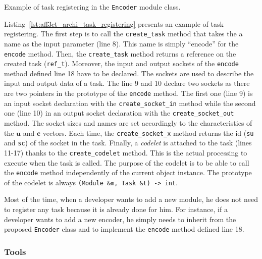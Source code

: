\begin{listing}[htp]
  \inputminted[frame=lines,linenos]{C++}{\curChapter/src/archi/task_registering.cpp}
  \caption{Example of task registering in the \texttt{Encoder} module class.}
  \label{lst:aff3ct_archi_task_registering}
\end{listing}

Listing~\ref{lst:aff3ct_archi_task_registering} presents an example of task
registering. The first step is to call the \verb|create_task| method that
takes the a name as the input parameter (line 8). This name is simply ``encode''
for the \verb|encode| method. Then, the \verb|create_task| method returns a
reference on the created task (\verb|ref_t|). Moreover, the input and output
sockets of the \verb|encode| method defined line 18 have to be declared. The
sockets are used to describe the input and output data of a task. The line 9 and
10 declare two sockets as there are two pointers in the prototype of the
\verb|encode| method. The first one (line 9) is an input socket declaration with
the \verb|create_socket_in| method while the second one (line 10) in an output
socket declaration with the \verb|create_socket_out| method. The socket sizes
and names are set accordingly to the characteristics of the $\bm{u}$ and
$\bm{c}$ vectors. Each time, the \verb|create_socket_x| method returns the id
(\verb|su| and \verb|sc|) of the socket in the task. Finally, a \emph{codelet}
is attached to the task (lines 11-17) thanks to the \verb|create_codelet|
method. This is the actual processing to execute when the task is called. The
purpose of the codelet is to be able to call the \verb|encode| method
independently of the current object instance. The prototype of the codelet is
always \verb|(Module &m, Task &t) -> int|.

Most of the time, when a developer wants to add a new module, he does not need
to register any task because it is already done for him. For instance, if a
developer wants to add a new encoder, he simply needs to inherit from the
proposed \verb|Encoder| class and to implement the \verb|encode| method defined
line 18.

\subsubsection{Tools}


